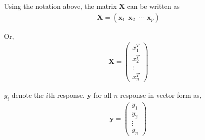 \documentclass[12pt,a4paper]{article}%
\theoremstyle{definition}
\theoremstyle{plain}
\numberwithin{equation}{section}
\begin{document}
Using the notation above, the matrix $\mathbf{X}$ can be written as
\begin{gather}
\mathbf{X} =  (\mathbf{x}_{1} ~~ \mathbf{x}_{2} ~~  \cdots ~~  \mathbf{x}_{p})
\end{gather}

Or, 
\begin{gather}
\mathbf{X} =  \begin{pmatrix}
  x_{1}^{T} \\
  x_{2}^{T} \\
  \vdots \\
  x_{n}^{T}
 \end{pmatrix}
\end{gather}

$y_{i}$ denote the $i$th response. $\mathbf{y}$ for all $n$ response in vector form as,
\begin{gather}
\mathbf{y} =  \begin{pmatrix}
  y_{1} \\
  y_{2} \\
  \vdots \\
  y_{n}
 \end{pmatrix}
\end{gather}
\end{document}
